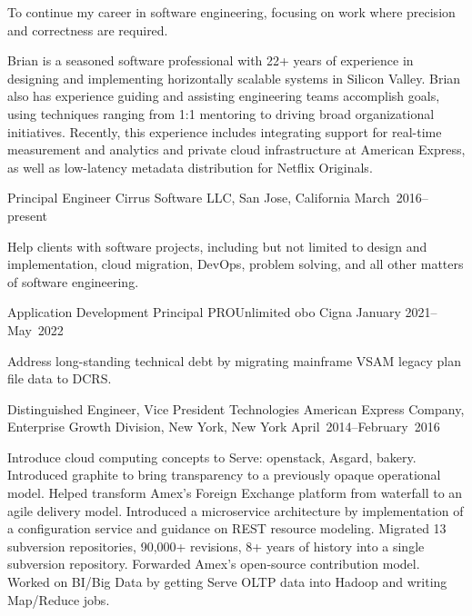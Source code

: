 \documentclass{resume}
\begin{document}
\begin{resume}
\begin{Objective}
To continue my career in software engineering, focusing on work where precision and correctness are required. 
\end{Objective}

\begin{Profile}
Brian is a seasoned software professional with 22+ years of experience
in designing and implementing horizontally scalable systems in Silicon
Valley. Brian also has experience guiding and assisting engineering
teams accomplish goals, using techniques ranging from 1:1 mentoring to
driving broad organizational initiatives. Recently, this experience
includes integrating support for real-time measurement and analytics
and private cloud infrastructure at American Express, as well as
low-latency metadata distribution for Netflix Originals.
\end{Profile}

\begin{Employment}
\begin{job}{Principal Engineer}
           {Cirrus Software LLC, San Jose, California}
           {March~2016--present}

Help clients with software projects, including but not limited to design and implementation, cloud migration, DevOps, problem solving, and all other matters of software engineering.

\end{job}

\begin{job}{Application Development Principal}
           {PROUnlimited obo Cigna}
           {January 2021--May~2022}

Address long-standing technical debt by migrating mainframe VSAM legacy plan file data to DCRS.

\end{job}
\begin{job}{Distinguished Engineer, Vice President Technologies}
           {American Express Company, Enterprise Growth Division, New York, New York}
           {April~2014--February~2016}

Introduce cloud computing concepts to Serve: openstack, Asgard,
bakery. Introduced graphite to bring transparency to a previously
opaque operational model. Helped transform Amex's Foreign Exchange
platform from waterfall to an agile delivery model. Introduced a
microservice architecture by implementation of a configuration service
and guidance on REST resource modeling. Migrated 13 subversion
repositories, 90,000+ revisions, 8+ years of history into a single
subversion repository. Forwarded Amex's open-source contribution
model. Worked on BI/Big Data by getting Serve OLTP data into Hadoop
and writing Map/Reduce jobs.


\end{job}
\end{Employment}
\end{resume}
\end{document}

